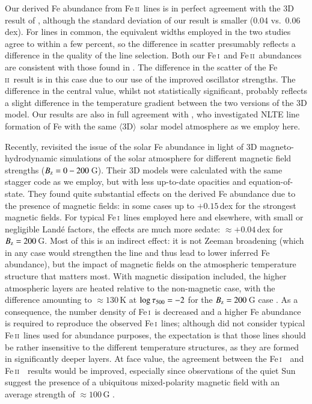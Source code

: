 \documentclass[traditabstract]{aa}
\newcommand{\oneDAV}{$\langle\mathrm{3D}\rangle$}
\newcommand{\altfei}{Fe\,\textsc{i}}
\newcommand{\altfeii}{Fe\,\textsc{ii}}
\newcommand{\fei}{\altfei\ }
\newcommand{\feii}{\altfeii\ }
\begin{document}
Our derived Fe abundance from \feii lines is in perfect agreement with the 3D result of \citet[][$\log \epsilon_\mathrm{Fe}=7.51$]{Caffau11}, although the standard deviation of our result is smaller (0.04 vs.\ 0.06\,dex).  For lines in common, the equivalent widths employed in the two studies agree to within a few percent, so the difference in scatter presumably reflects a difference in the quality of the line selection.  Both our \fei and \feii abundances are consistent with those found in \citet[][$\log \epsilon_\mathrm{Fe}=7.44\pm0.05$ and $7.45\pm0.10$ respectively]{AspII}.  The difference in the scatter of the \feii result is in this case due to our use of the improved \citet{Melendez09} oscillator strengths.  The difference in the central value, whilst not statistically significant, probably reflects a slight difference in the temperature gradient between the two versions of the 3D model.  Our results are also in full agreement with \citet[][$\log \epsilon_\mathrm{Fe}=7.46\pm0.02$]{MB_fe}, who investigated NLTE line formation of Fe with the same \oneDAV\ solar model atmosphere as we employ here.

Recently, \citet{2010ApJ...724.1536F, 2012A&A...548A..35F} revisited the issue of the solar Fe abundance
in light of 3D magneto-hydrodynamic simulations of the solar atmosphere for different magnetic field strengths ($B_{\rm z} = 0-200$\,G). 
Their 3D models were calculated with the same {\sc stagger} code as we employ, but with less up-to-date
opacities and equation-of-state. 
They found quite substantial effects on the derived Fe abundance due to the presence of magnetic fields: in some
cases up to $+0.15$\,dex for the strongest magnetic fields. 
For typical \fei lines employed here and elsewhere, with small or negligible Land\'e factors, the effects are much more sedate: 
$\approx +0.04$\,dex for $B_{\rm z} = 200$\,G. Most of this is an indirect effect: it is not Zeeman broadening (which in 
any case would strengthen the line and thus lead to lower inferred Fe abundance), but the impact of magnetic fields
on the atmospheric temperature structure that matters most. With magnetic dissipation included, the higher atmospheric
layers are heated relative to the non-magnetic case, with the difference amounting to $\approx$$130$\,K at $\log \tau_{\rm 500} = -2$
for the $B_{\rm z} = 200$\,G case \citep{2012A&A...548A..35F}. As a consequence, the number density of \fei is decreased
and a higher Fe abundance is required to reproduce the observed \fei lines; although \citet{2012A&A...548A..35F} did not consider
typical \feii lines used for abundance purposes, the expectation is that those lines should be rather insensitive to the different
temperature structures, as they are formed in significantly deeper layers. At face value, the agreement between the \fei\ and \feii\ 
results would be improved, especially since observations of the quiet Sun suggest the presence of a ubiquitous mixed-polarity magnetic field 
with an average strength of $\approx 100$\,G \citep{2004Natur.430..326T}.
\end{document}

